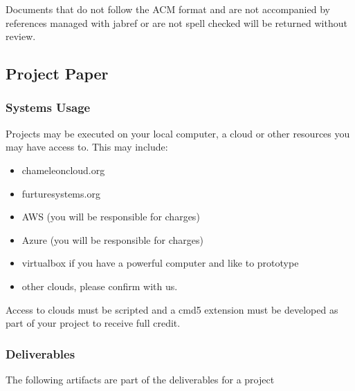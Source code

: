Documents that do not follow the ACM format and are not accompanied by
references managed with jabref or are not spell checked will
be returned without review.

\subsection{Project Paper}\label{s:paper-rules}

\subsubsection{Systems Usage}

Projects may be executed on your local computer, a cloud or other
resources you may have access to. This may include:

\begin{itemize}
\item chameleoncloud.org
\item furturesystems.org
\item AWS (you will be responsible for charges)
\item Azure (you will be responsible for charges)
\item virtualbox if you have a powerful computer and like to prototype
\item other clouds, please confirm with us.
\end{itemize}

Access to clouds must be scripted and a cmd5 extension must be
developed as part of your project to receive full credit.

\subsubsection{Deliverables}

The following artifacts are part of the deliverables for a project

